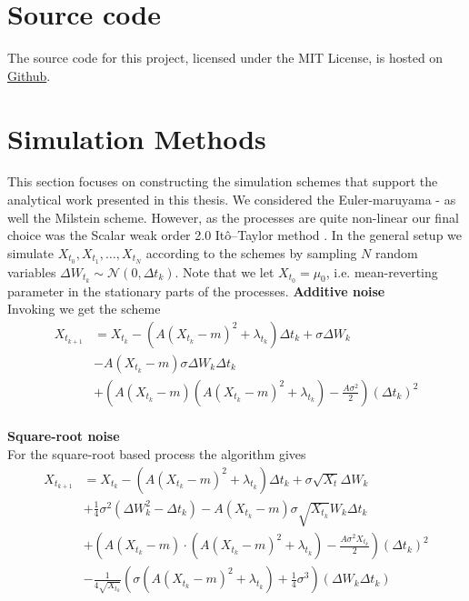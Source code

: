 \section{Source code}
The source code for this project, licensed under the MIT License, is hosted on \href{https://github.com/Gantzhorn/Thesis}{Github}.
\section{Simulation Methods}\label{appendix:simMethods}
This section focuses on constructing the simulation schemes that support the analytical work presented in this thesis. We considered the Euler-maruyama - as well the Milstein scheme. However, as the processes are quite non-linear our final choice was the Scalar weak order 2.0 Itô–Taylor method \cite[algorithm 8.5]{Srkk2019}. In the general setup we simulate $X_{t_0},X_{t_1},\dots, X_{t_N}$ according to the schemes by sampling $N$ random variables $\Delta W_{t_k}\sim\mathcal{N}\left(0, \Delta t_k\right)$. Note that we let $X_{t_0} = \mu_0$, i.e. mean-reverting parameter in the stationary parts of the processes.
\noindent \textbf{Additive noise}\\
Invoking \cite[algorithm 8.5]{Srkk2019} we get the scheme
\begin{align}
    X_{t_{k + 1}} &= X_{t_k} - \left(A(X_{t_k} - m)^2 + \lambda_{t_k}\right) \Delta t_k + \sigma \Delta W_{k} \nonumber \\&-  A \left(X_{t_k} - m\right)\sigma \Delta W_k \Delta t_k\nonumber \\
    & + \left(A\left(X_{t_k} - m\right)\left(A\left(X_{t_k} - m\right)^2 + \lambda_{t_k}\right) - \frac{A \sigma^2}{2}\right)\left(\Delta t_k\right)^2 \label{eq:OUSim}
\end{align}
\\
\textbf{Square-root noise}\\
For the square-root based process the algorithm gives 
\begin{align}
    X_{t_{k + 1}} &= X_{t_k} - \left(A(X_{t_k} - m)^2 + \lambda_{t_k}\right) \Delta t_k + \sigma \sqrt{X_t} \Delta W_{k}\nonumber\\ &+ \frac{1}{4}\sigma^2 \left(\Delta W_k^2 - \Delta t_k\right)     - A\left(X_{t_k} - m\right)\sigma \sqrt{X_{t_k}} W_k \Delta t_k
    \nonumber\\
     &+ \left(A\left(X_{t_k} - m\right)\cdot \left(A\left(X_{t_k} - m\right)^2 + \lambda_{t_k}\right) - \frac{A\sigma^2 X_{t_k}}{2}\right)(\Delta t_k)^2 \nonumber\\
    &- \frac{1}{4\sqrt{X_{t_k}}}\left(\sigma\left(A\left(X_{t_k} - m\right)^2 + \lambda_{t_k}\right) + \frac{1}{4}\sigma^3\right) \left(\Delta W_k \Delta t_k\right)
\end{align}
